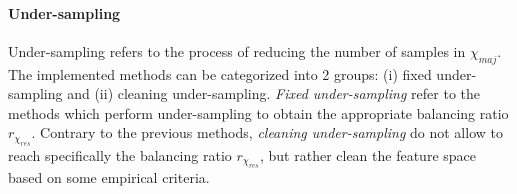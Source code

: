 \documentclass[twoside,11pt]{article}
\begin{document}
\paragraph{Under-sampling}
Under-sampling refers to the process of reducing the number of samples in $\chi_{maj}$.
The implemented methods can be categorized into 2 groups: (i) fixed under-sampling and (ii) cleaning under-sampling.
\emph{Fixed under-sampling} refer to the methods which perform under-sampling to obtain the appropriate balancing ratio $r_{\chi_{res}}$.
Contrary to the previous methods, \emph{cleaning under-sampling} do not allow to reach specifically the balancing ratio $r_{\chi_{res}}$, but rather clean the feature space based on some empirical criteria.
\end{document}
